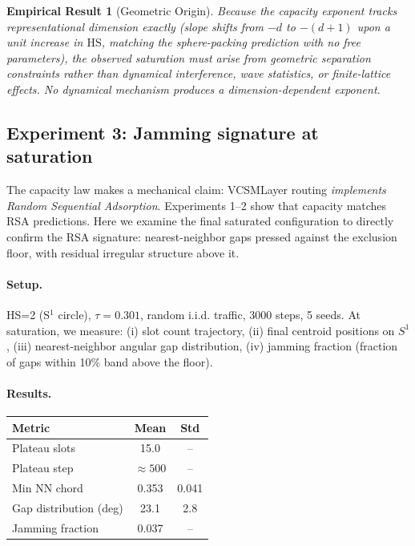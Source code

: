 \documentclass[11pt]{article}
\newtheorem{result}[theorem]{Empirical Result}
\begin{document}
\begin{result}[Geometric Origin]
\label{res:geometric}
Because the capacity exponent tracks representational dimension exactly
(slope shifts from $-d$ to $-(d+1)$ upon a unit increase in $\mathrm{HS}$,
matching the sphere-packing prediction with no free parameters),
the observed saturation must arise from geometric separation constraints
rather than dynamical interference, wave statistics, or finite-lattice effects.
No dynamical mechanism produces a dimension-dependent exponent.
\end{result}

\subsection{Experiment 3: Jamming signature at saturation}
\label{sec:jamming_signature}

The capacity law makes a mechanical claim: VCSMLayer routing
\emph{implements Random Sequential Adsorption}.
Experiments 1--2 show that capacity matches RSA predictions.
Here we examine the final saturated configuration to directly confirm the RSA signature:
nearest-neighbor gaps pressed against the exclusion floor,
with residual irregular structure above it.

\paragraph{Setup.}
HS=2 (S$^1$ circle), $\tau = 0.301$, random i.i.d. traffic, 3000 steps, 5 seeds.
At saturation, we measure: (i) slot count trajectory, (ii) final centroid positions on $S^1$,
(iii) nearest-neighbor angular gap distribution, (iv) jamming fraction (fraction of gaps
within 10\% band above the floor).

\paragraph{Results.}
\begin{center}
\begin{tabular}{lcc}
\toprule
Metric & Mean & Std \\
\midrule
Plateau slots & 15.0 & -- \\
Plateau step & $\approx 500$ & -- \\
Min NN chord & 0.353 & 0.041 \\
Gap distribution (deg) & 23.1 & 2.8 \\
Jamming fraction & 0.037 & -- \\
\bottomrule
\end{tabular}
\end{center}
\end{document}
